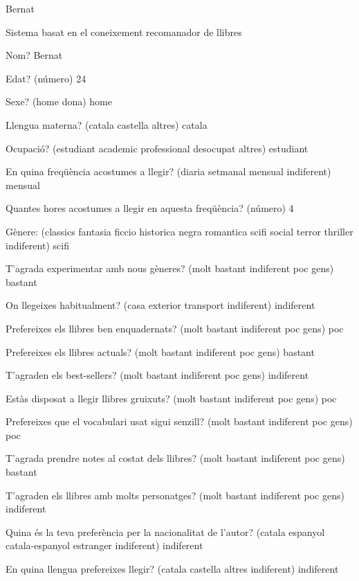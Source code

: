 


Bernat

Sistema basat en el coneixement recomanador de llibres

Nom? Bernat

Edat?  (número) 24

Sexe? (home dona) home

Llengua materna? (catala castella altres) catala

Ocupació? (estudiant academic professional desocupat altres) estudiant

En quina freqüència acostumes a llegir? (diaria setmanal mensual indiferent) mensual

Quantes hores acostumes a llegir en aquesta freqüència? (número) 4

Gènere:  (classics fantasia ficcio historica negra romantica scifi social terror thriller indiferent) scifi

T'agrada experimentar amb nous gèneres? (molt bastant indiferent poc gens) bastant

On llegeixes habitualment? (casa exterior transport indiferent) indiferent

Prefereixes els llibres ben enquadernats? (molt bastant indiferent poc gens) poc

Prefereixes els llibres actuals? (molt bastant indiferent poc gens) bastant   

T'agraden els best-sellers? (molt bastant indiferent poc gens) indiferent

Estàs disposat a llegir llibres gruixuts? (molt bastant indiferent poc gens) poc

Prefereixes que el vocabulari usat sigui senzill? (molt bastant indiferent poc gens) poc

T'agrada prendre notes al costat dels llibres? (molt bastant indiferent poc gens) bastant

T'agraden els llibres amb molts personatges? (molt bastant indiferent poc gens) indiferent

Quina és la teva preferència per la nacionalitat de l'autor? (catala espanyol catala-espanyol estranger indiferent) indiferent

En quina llengua prefereixes llegir? (catala castella altres indiferent) indiferent

